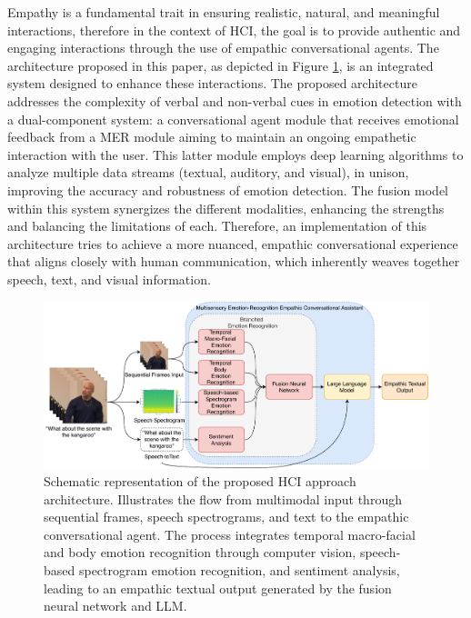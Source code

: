 \documentclass[runningheads]{llncs}
\begin{document}
Empathy is a fundamental trait in ensuring realistic, natural, and meaningful interactions, therefore in the context of HCI, the goal is to provide authentic and engaging interactions through the use of empathic conversational agents. The architecture proposed in this paper, as depicted in Figure \ref{fig:approachArchitecture}, is an integrated system designed to enhance these interactions. The proposed architecture addresses the complexity of verbal and non-verbal cues in emotion detection with a dual-component system: a conversational agent module that receives emotional feedback from a MER module aiming to maintain an ongoing empathetic interaction with the user. This latter module employs deep learning algorithms to analyze multiple data streams (textual, auditory, and visual), in unison, improving the accuracy and robustness of emotion detection. The fusion model within this system synergizes the different modalities, enhancing the strengths and balancing the limitations of each. Therefore, an implementation of this architecture tries to achieve a more nuanced, empathic conversational experience that aligns closely with human communication, which inherently weaves together speech, text, and visual information.

\begin{figure}[htb]
	\centering
	\includegraphics[width=0.97\linewidth]{approachArchitecture.pdf}
	\caption{Schematic representation of the proposed HCI approach architecture. Illustrates the flow from multimodal input through sequential frames, speech spectrograms, and text to the empathic conversational agent. The process integrates temporal macro-facial and body emotion recognition through computer vision, speech-based spectrogram emotion recognition, and sentiment analysis, leading to an empathic textual output generated by the fusion neural network and LLM.}
	\label{fig:approachArchitecture}
\end{figure}
\end{document}
